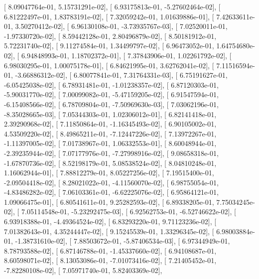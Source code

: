 \documentclass{article}
\begin{document}
       [  8.09047764e-01,   5.15731291e-02],
       [  6.93175813e-01,  -5.27602464e-02],
       [  6.81222497e-01,   1.83783191e-02],
       [  7.32059242e-01,   1.01639886e-01],
       [  7.42633611e-01,   3.50270412e-02],
       [  6.96130108e-01,  -3.73935767e-03],
       [  7.02520011e-01,  -1.97330720e-02],
       [  8.59442128e-01,   2.80496879e-02],
       [  8.50181912e-01,   5.72231740e-02],
       [  9.11274584e-01,   1.34499797e-02],
       [  6.96473052e-01,   1.64754680e-02],
       [  6.94848993e-01,   1.18702372e-01],
       [  7.37843906e-01,   1.02261792e-02],
       [  6.98030295e-01,   1.00075178e-01],
       [  6.84621995e-01,   3.62762041e-02],
       [  7.11516594e-01,  -3.66886312e-02],
       [  6.80077841e-01,   7.31764331e-03],
       [  6.75191627e-01,  -6.05425038e-02],
       [  6.78931481e-01,  -1.01238357e-02],
       [  6.87120303e-01,  -5.90031770e-02],
       [  7.00099082e-01,  -5.47159205e-02],
       [  6.91547594e-01,  -6.15408566e-02],
       [  6.78709804e-01,  -7.50969630e-03],
       [  7.03062196e-01,  -8.35028665e-03],
       [  7.05344303e-01,   1.02306012e-01],
       [  6.82141418e-01,   2.39290968e-02],
       [  7.11850864e-01,  -1.16345493e-02],
       [  6.90105002e-01,   4.53509220e-02],
       [  8.49865211e-01,  -7.12447226e-02],
       [  7.13972267e-01,  -1.11397005e-02],
       [  7.01738967e-01,   1.06332553e-01],
       [  8.60048944e-01,  -2.39235944e-02],
       [  7.07177976e-01,  -7.27998916e-02],
       [  9.08658318e-01,  -1.67870736e-02],
       [  8.52198179e-01,   5.08538524e-02],
       [  8.04810248e-01,   1.16062944e-01],
       [  7.88812279e-01,   8.05227256e-02],
       [  7.19515400e-01,  -2.09504418e-02],
       [  8.28021022e-01,  -4.11560070e-02],
       [  6.98755054e-01,  -4.83486282e-02],
       [  7.06103361e-01,  -6.62225076e-02],
       [  6.95864121e-01,   1.09066475e-01],
       [  6.80541611e-01,   9.25282593e-02],
       [  6.89338205e-01,   7.75034245e-02],
       [  7.05114548e-01,  -5.23292475e-03],
       [  6.92562753e-01,  -6.52746622e-02],
       [  6.93918388e-01,  -4.49364524e-02],
       [  6.83293220e-01,   9.71123236e-02],
       [  7.01382643e-01,   4.35244447e-02],
       [  9.15245539e-01,   1.33296345e-02],
       [  6.98003884e-01,  -1.38731610e-02],
       [  7.88503672e-01,  -5.87406534e-03],
       [  6.97344949e-01,   8.78793588e-02],
       [  6.87146788e-01,  -1.45337660e-02],
       [  6.94108687e-01,   8.60598071e-02],
       [  8.13053086e-01,  -7.01073416e-02],
       [  7.21405452e-01,  -7.82280108e-02],
       [  7.05971740e-01,   5.82403369e-02],
\end{document}
